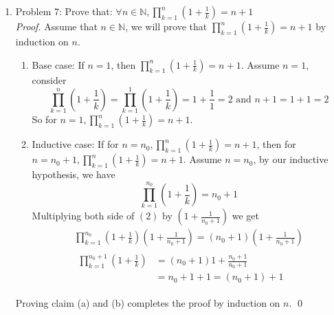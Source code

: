 \documentclass{article}
\begin{document}
\begin{enumerate}
    \item Problem 7: Prove that: $\forall n \in \mathbb{N}, \prod\limits_{k=1}^{n} (1 + \frac{1}{k}) = n + 1$\\
        \emph{Proof.} Assume that $n \in \mathbb{N}$, 
        we will prove that $\prod\limits_{k=1}^n (1 + \frac{1}{k}) = n + 1$ by induction on $n$.
        \begin{enumerate}
            \item Base case: If $n = 1$, then $\prod\limits_{k=1}^n (1 + \frac{1}{k}) = n + 1$.
                Assume $n = 1$, consider
                \begin{equation*}
                    \prod\limits_{k=1}^n (1 + \frac{1}{k}) = \prod\limits_{k=1}^1 (1 + \frac{1}{k}) = 1 + \frac{1}{1} = 2 \text{ and } n + 1 = 1 + 1 = 2
                \end{equation*}
                So for $n = 1, \prod\limits_{k=1}^n (1 + \frac{1}{k}) = n + 1$.
            \item Inductive case: If for $n = n_0, \prod\limits_{k=1}^n (1 + \frac{1}{k}) = n + 1$, then 
                for $n = n_0 + 1, \prod\limits_{k=1}^n (1 + \frac{1}{k}) = n + 1$.
                Assume $n = n_0$, by our inductive hypothesis, we have
                \begin{equation}
                    \prod\limits_{k=1}^{n_0} (1 + \frac{1}{k}) = n_0 + 1
                \end{equation}
                Multiplying both side of $(2)$ by $(1 + \frac{1}{n_0 + 1})$ we get
                \begin{gather*}
                    \prod\limits_{k=1}^{n_0} (1 + \frac{1}{k})(1 + \frac{1}{n_0 + 1}) = (n_0 + 1)(1 + \frac{1}{n_0 + 1})\\
                    \begin{split}
                        \prod\limits_{k=1}^{n_0 + 1} (1 + \frac{1}{k})& = (n_0 + 1)1 + \frac{n_0+1}{n_0+1}\\
                        &= n_0 + 1 + 1 = (n_0 + 1) + 1
                    \end{split}
                \end{gather*}
        \end{enumerate}
        Proving claim (a) and (b) completes the proof by induction on $n$. \qed

\end{enumerate}
\end{document}
